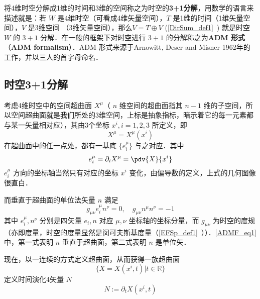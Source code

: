 
\begin{issues}
\issueTODO
\end{issues}

将4维时空分解成1维的时间和3维的空间称之为时空的\textbf{3+1分解}，用数学的语言来描述就是：若 $W$ 是4维时空（可看成4维矢量空间），$T$ 是1维的时间（1维矢量空间），$V$ 是3维空间 （3维矢量空间），那么$V=T\oplus V$ (\autoref{DirSum_def1}~) 就是时空 $W$ 的 $3+1$ 分解．在一般的框架下对时空进行 $3+1$ 的分解称之为\textbf{ADM 形式}（\textbf{ADM formalism}）．ADM 形式来源于Arnowitt, Deser and Misner 1962年的工作，并以三人的首字母命名．
\subsection{时空3+1分解}
考虑4维时空中的空间超曲面 $X^\mu$（ $n$ 维空间的超曲面指其 $n-1$ 维的子空间，所以空间超曲面就是我们所处的3维空间，上标是抽象指标，暗示着它的每一元素都与某一矢量相对应），其由3个坐标 $x^i,i=1,2,3$ 所定义，即 
\begin{equation}
X^\mu=X^\mu(x^i)
\end{equation}
在超曲面中的任一点处，都有一基底 $\{e^\mu_i\}$ 与之对应．其中
\begin{equation}
e^\mu_i=\partial_i  X^\mu=\pdv{ X}{x^i}
\end{equation}
$e^\mu_i$ 方向的坐标轴当然只有对应的坐标 $x^i$ 变化，由偏导数的定义，上式的几何图像很直白．

而垂直于超曲面的单位法矢量 $n$ 满足
\begin{equation}\label{ADMF_eq1}
g_{\mu\nu} e_i^\mu n^\nu=0,\quad g_{\mu\nu}n^\mu n^\nu=-1
\end{equation}
其中 $e_i^\mu,n^\nu$ 分别是四矢量 $ e_i,n$ 对应 $\mu,\nu$ 坐标轴的坐标分量，而 $g_{\mu\nu}$ 为时空的度规（亦即度量，时空的度量显然是闵可夫斯基度量（\autoref{EFSp_def1}~））．\autoref{ADMF_eq1} 中，第一式表明 $n$ 垂直于超曲面，第二式表明 $n$ 是单位矢．

现在，以一连续的方式定义超曲面，从而获得一族超曲面 
\begin{equation}
\{{X}= X(x^i,t)|t\in\mathbb R\}
\end{equation}
定义时间演化4矢量 $N$
\begin{equation}
N:=\partial_t  X(x^i,t)
\end{equation}


